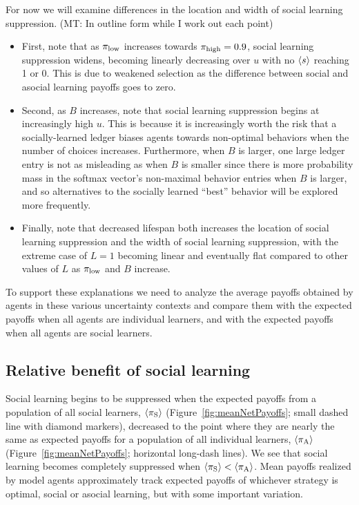 \documentclass[letterpaper,11.5pt]{scrartcl}
\newcommand{\mt}[1]{{\textcolor{myorange} {({\tiny MT:} #1)}}}
\begin{document}
For now we will examine differences in the location and width of social 
learning suppression. \mt{In outline form while I work out each point}
\begin{itemize}
  \item 
    First, note that as $\pi_{\mathrm{low}}$ increases towards $\pi_{\mathrm{high}} = 0.9$, social learning
    suppression widens, becoming linearly decreasing over $u$ with no $\langle s \rangle$
    reaching 1 or 0. This is due to weakened selection as the difference between
    social and asocial learning payoffs goes to zero.
  \item
    Second, as $B$ increases, note that social learning suppression 
    begins at increasingly high $u$. This is because it is increasingly worth
    the risk that a socially-learned ledger biases agents towards non-optimal
    behaviors when the number of choices increases. Furthermore, when $B$ is
    larger, one large ledger entry is not as misleading as when $B$ is smaller
    since there is more probability mass in the softmax vector's non-maximal
    behavior entries when $B$ is larger, and so alternatives to the socially
    learned ``best'' behavior will be explored more frequently.
  \item
    Finally, note that decreased lifespan both increases the location of 
    social learning suppression and the width of social learning suppression,
    with the extreme case of $L=1$ becoming linear and eventually flat compared
    to other values of $L$ as $\pi_{\mathrm{low}}$ and $B$ increase.
\end{itemize}
To support these explanations we need to analyze the average payoffs 
obtained by agents in these various uncertainty contexts and compare them
with the expected payoffs when all agents are individual learners, and with the
expected payoffs when all agents are social learners.

\subsection{Relative benefit of social learning}

Social learning begins to be suppressed when the expected payoffs from 
a population of all social learners, $\langle \pi_\mathrm{S} \rangle$ (Figure~\ref{fig:meanNetPayoffs};
small dashed line with diamond markers),
decreased to the point where they are nearly the same as expected payoffs for
a population of all individual learners, $\langle \pi_\mathrm{A} \rangle$
(Figure~\ref{fig:meanNetPayoffs}; horizontal long-dash lines). We see that social 
learning becomes completely suppressed when $\langle \pi_\mathrm{S} \rangle < \langle \pi_\mathrm{A} \rangle$.  Mean 
payoffs realized by model agents approximately track expected payoffs of
whichever strategy is optimal, social or asocial learning, but with some important
variation.
\end{document}

